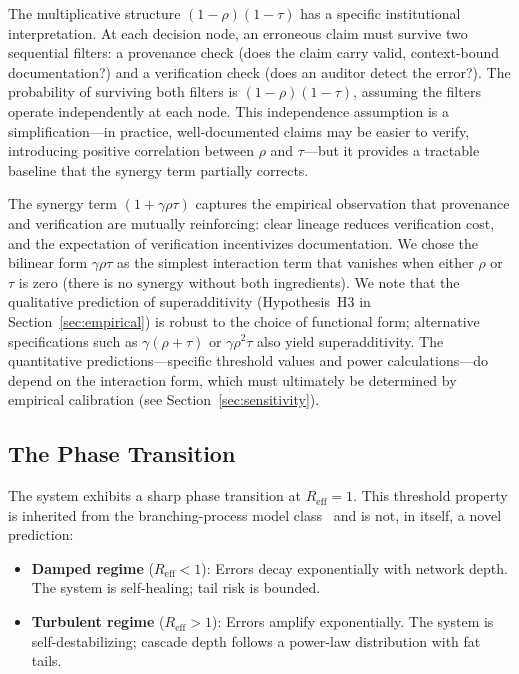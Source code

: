 \documentclass[runningheads]{llncs}
\begin{document}
The multiplicative structure $(1-\rho)(1-\tau)$ has a specific institutional interpretation. At each decision node, an erroneous claim must survive two sequential filters: a provenance check (does the claim carry valid, context-bound documentation?) and a verification check (does an auditor detect the error?). The probability of surviving both filters is $(1-\rho)(1-\tau)$, assuming the filters operate independently at each node. This independence assumption is a simplification---in practice, well-documented claims may be easier to verify, introducing positive correlation between $\rho$ and $\tau$---but it provides a tractable baseline that the synergy term partially corrects.

The synergy term $(1+\gamma\rho\tau)$ captures the empirical observation that provenance and verification are mutually reinforcing: clear lineage reduces verification cost, and the expectation of verification incentivizes documentation. We chose the bilinear form $\gamma\rho\tau$ as the simplest interaction term that vanishes when either $\rho$ or $\tau$ is zero (there is no synergy without both ingredients). We note that the qualitative prediction of superadditivity (Hypothesis~H3 in Section~\ref{sec:empirical}) is robust to the choice of functional form; alternative specifications such as $\gamma(\rho+\tau)$ or $\gamma\rho^2\tau$ also yield superadditivity. The quantitative predictions---specific threshold values and power calculations---do depend on the interaction form, which must ultimately be determined by empirical calibration (see Section~\ref{sec:sensitivity}).

\subsection{The Phase Transition}

The system exhibits a sharp phase transition at $R_{\mathrm{eff}} = 1$. This threshold property is inherited from the branching-process model class~\cite{anderson1991infectious,hethcote2000mathematics} and is not, in itself, a novel prediction:

\begin{itemize}
\item \textbf{Damped regime} ($R_{\mathrm{eff}} < 1$): Errors decay exponentially with network depth. The system is self-healing; tail risk is bounded.
\item \textbf{Turbulent regime} ($R_{\mathrm{eff}} > 1$): Errors amplify exponentially. The system is self-destabilizing; cascade depth follows a power-law distribution with fat tails.
\end{itemize}
\end{document}
